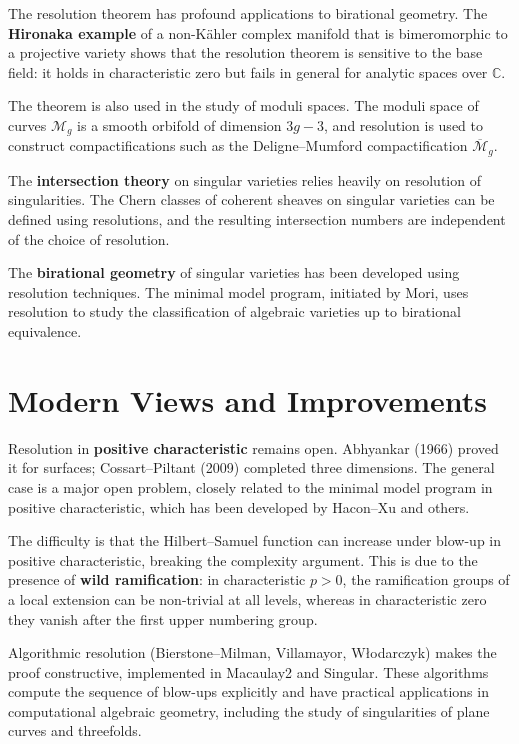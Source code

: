 The resolution theorem has profound applications to birational geometry. The \textbf{Hironaka example} of a non-K\"ahler complex manifold that is bimeromorphic to a projective variety shows that the resolution theorem is sensitive to the base field: it holds in characteristic zero but fails in general for analytic spaces over $\mathbb{C}$.

The theorem is also used in the study of moduli spaces. The moduli space of curves $\mathcal{M}_g$ is a smooth orbifold of dimension $3g-3$, and resolution is used to construct compactifications such as the Deligne--Mumford compactification $\overline{\mathcal{M}}_g$.

The \textbf{intersection theory} on singular varieties relies heavily on resolution of singularities. The Chern classes of coherent sheaves on singular varieties can be defined using resolutions, and the resulting intersection numbers are independent of the choice of resolution.

The \textbf{birational geometry} of singular varieties has been developed using resolution techniques. The minimal model program, initiated by Mori, uses resolution to study the classification of algebraic varieties up to birational equivalence.

\section{Modern Views and Improvements}

Resolution in \textbf{positive characteristic} remains open. Abhyankar (1966) proved it for surfaces; Cossart--Piltant (2009) completed three dimensions. The general case is a major open problem, closely related to the minimal model program in positive characteristic, which has been developed by Hacon--Xu and others.

The difficulty is that the Hilbert--Samuel function can increase under blow-up in positive characteristic, breaking the complexity argument. This is due to the presence of \textbf{wild ramification}: in characteristic $p > 0$, the ramification groups of a local extension can be non-trivial at all levels, whereas in characteristic zero they vanish after the first upper numbering group.

Algorithmic resolution (Bierstone--Milman, Villamayor, W\l{}odarczyk) makes the proof constructive, implemented in Macaulay2 and Singular. These algorithms compute the sequence of blow-ups explicitly and have practical applications in computational algebraic geometry, including the study of singularities of plane curves and threefolds.

